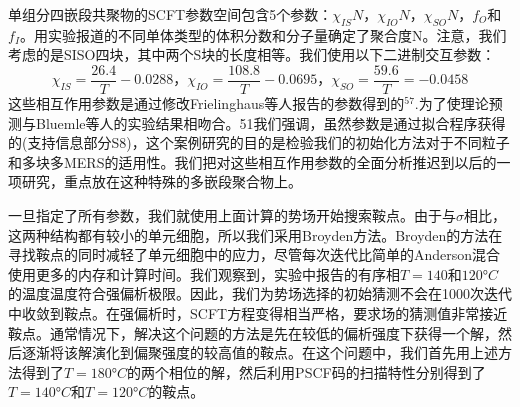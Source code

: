 \documentclass[12pt，a4paper]{article}
\numberwithin{equation}{section}
\begin{document}
单组分四嵌段共聚物的SCFT参数空间包含5个参数：$\chi _{IS}N，\chi _{IO}N，\chi _{SO}N，f_O$和$f_I$。用实验报道的不同单体类型的体积分数和分子量确定了聚合度N。注意，我们考虑的是SISO四块，其中两个S块的长度相等。我们使用以下二进制交互参数：
\begin{equation}\label{25}
\chi _{IS}=\frac{26.4}{T}-0.0288，\chi _{IO}=\frac{108.8}{T}-0.0695，\chi _{SO}=\frac{59.6}{T}=-0.0458
\end{equation}
这些相互作用参数是通过修改Frielinghaus等人报告的参数得到的$^{57}$.为了使理论预测与Bluemle等人的实验结果相吻合。51我们强调，虽然参数是通过拟合程序获得的(支持信息部分S8)，这个案例研究的目的是检验我们的初始化方法对于不同粒子和多块多MERS的适用性。我们把对这些相互作用参数的全面分析推迟到以后的一项研究，重点放在这种特殊的多嵌段聚合物上。

一旦指定了所有参数，我们就使用上面计算的势场开始搜索鞍点。由于与$\sigma$相比，这两种结构都有较小的单元细胞，所以我们采用Broyden方法。Broyden的方法在寻找鞍点的同时减轻了单元细胞中的应力，尽管每次迭代比简单的Anderson混合使用更多的内存和计算时间。我们观察到，实验中报告的有序相$T=140$和$120°C$的温度温度符合强偏析极限。因此，我们为势场选择的初始猜测不会在1000次迭代中收敛到鞍点。在强偏析时，SCFT方程变得相当严格，要求场的猜测值非常接近鞍点。通常情况下，解决这个问题的方法是先在较低的偏析强度下获得一个解，然后逐渐将该解演化到偏聚强度的较高值的鞍点。在这个问题中，我们首先用上述方法得到了$T=180°C$的两个相位的解，然后利用PSCF码的扫描特性分别得到了$T=140°C$和$T=120°C$的鞍点。
\end{document}
